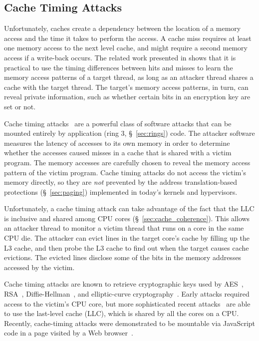 \subsection{Cache Timing Attacks}
\label{sec:cache_timing}


Unfortunately, caches create a dependency between the location of a memory
access and the time it takes to perform the access. A cache miss requires
at least one memory access to the next level cache, and might require a second
memory access if a write-back occurs. The related work presented in
\cite{banescu2011cache} shows that it is practical to use the timing
differences between hits and misses to learn the memory access patterns of a
target thread, as long as an attacker thread shares a cache with the target
thread. The target's memory access patterns, in turn, can reveal private
information, such as whether certain bits in an encryption key are set or not.


Cache timing attacks~\cite{banescu2011cache} are a powerful class of software
attacks that can be mounted entirely by application
(ring 3, \S~\ref{sec:rings}) code. The attacker software measures the latency
of accesses to its own memory in order to determine whether the accesses caused
misses in a cache that is shared with a victim program. The memory accesses are
carefully chosen to reveal the memory access pattern of the victim program.
Cache timing attacks do not access the victim's memory directly, so they are
\emph{not} prevented by the address translation-based protections
(\S~\ref{sec:paging}) implemented in today's kernels and hypervisors.

Unfortunately, a cache timing attack can take advantage of the fact that the
LLC is inclusive and shared among CPU cores (\S~\ref{sec:cache_coherence}).
This allows an attacker thread to monitor a victim thread that runs on a core
in the same CPU die. The attacker can evict lines in the target core's cache by
filling up the L3 cache, and then probe the L3 cache to find out when the
target causes cache evictions.  The evicted lines disclose some of the bits in
the memory addresses accessed by the victim.

Cache timing attacks are known to retrieve cryptographic keys used by
AES~\cite{bonneau2006aes}, RSA~\cite{brumley2005rsa},
Diffie-Hellman~\cite{kocher1996timing}, and elliptic-curve
cryptography~\cite{brumley2011ecc}.
Early attacks required access to the victim's CPU core, but more sophisticated
recent attacks~\cite{yarom2013llctiming, liu2015llctiming} are able to use the
last-level cache (LLC), which is shared by all the cores on a CPU. Recently,
cache-timing attacks were demonstrated to be mountable via JavaScript code in a
page visited by a Web browser~\cite{oren2015jstiming}.

